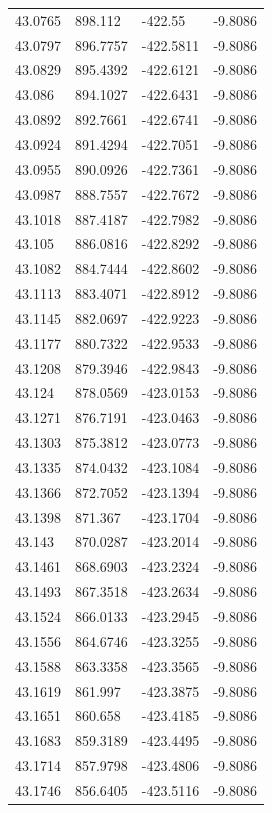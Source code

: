 \begin{table}[H]
\begin{tabular}{llll}
43.0765 & 898.112 & -422.55 & -9.8086 \\
43.0797 & 896.7757 & -422.5811 & -9.8086 \\
43.0829 & 895.4392 & -422.6121 & -9.8086 \\
43.086 & 894.1027 & -422.6431 & -9.8086 \\
43.0892 & 892.7661 & -422.6741 & -9.8086 \\
43.0924 & 891.4294 & -422.7051 & -9.8086 \\
43.0955 & 890.0926 & -422.7361 & -9.8086 \\
43.0987 & 888.7557 & -422.7672 & -9.8086 \\
43.1018 & 887.4187 & -422.7982 & -9.8086 \\
43.105 & 886.0816 & -422.8292 & -9.8086 \\
43.1082 & 884.7444 & -422.8602 & -9.8086 \\
43.1113 & 883.4071 & -422.8912 & -9.8086 \\
43.1145 & 882.0697 & -422.9223 & -9.8086 \\
43.1177 & 880.7322 & -422.9533 & -9.8086 \\
43.1208 & 879.3946 & -422.9843 & -9.8086 \\
43.124 & 878.0569 & -423.0153 & -9.8086 \\
43.1271 & 876.7191 & -423.0463 & -9.8086 \\
43.1303 & 875.3812 & -423.0773 & -9.8086 \\
43.1335 & 874.0432 & -423.1084 & -9.8086 \\
43.1366 & 872.7052 & -423.1394 & -9.8086 \\
43.1398 & 871.367 & -423.1704 & -9.8086 \\
43.143 & 870.0287 & -423.2014 & -9.8086 \\
43.1461 & 868.6903 & -423.2324 & -9.8086 \\
43.1493 & 867.3518 & -423.2634 & -9.8086 \\
43.1524 & 866.0133 & -423.2945 & -9.8086 \\
43.1556 & 864.6746 & -423.3255 & -9.8086 \\
43.1588 & 863.3358 & -423.3565 & -9.8086 \\
43.1619 & 861.997 & -423.3875 & -9.8086 \\
43.1651 & 860.658 & -423.4185 & -9.8086 \\
43.1683 & 859.3189 & -423.4495 & -9.8086 \\
43.1714 & 857.9798 & -423.4806 & -9.8086 \\
43.1746 & 856.6405 & -423.5116 & -9.8086 \\

\end{tabular}
\end{table}
